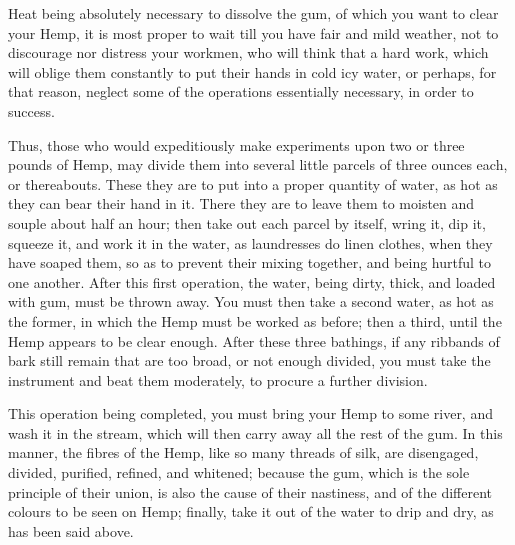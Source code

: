 \documentclass[a4paper, 11pt, oneside, polutonikogreek, english]{article}
\begin{document}
Heat being absolutely necessary to dissolve the gum, of which you want to clear your Hemp, it is most proper to wait till you have fair and mild weather, not to discourage nor distress your workmen, who will think that a hard work, which will oblige them constantly to put their hands in cold icy water, or perhaps, for that reason, neglect some of the operations essentially necessary, in order to success.

Thus, those who would expeditiously make experiments upon two or three pounds of Hemp, may divide them into several little parcels of three ounces each, or thereabouts. These they are to put into a proper quantity of water, as hot as they can bear their hand in it. There they are to leave them to moisten and souple about half an hour; then take out each parcel by itself, wring it, dip it, squeeze it, and work it in the water, as laundresses do linen clothes, when they have soaped them, so as to prevent their mixing together, and being hurtful to one another. After this first operation, the water, being dirty, thick, and loaded with gum, must be thrown away. You must then take a second water, as hot as the former, in which the Hemp must be worked as before; then a third, until the Hemp appears to be clear enough. After these three bathings, if any ribbands of bark still remain that are too broad, or not enough divided, you must take the instrument and beat them moderately, to procure a further division.

This operation being completed, you must bring your Hemp to some river, and wash it in the stream, which will then carry away all the rest of the gum. In this manner, the fibres of the Hemp, like so many threads of silk, are disengaged, divided, purified, refined, and whitened; because the gum, which is the sole principle of their union, is also the cause of their nastiness, and of the different colours to be seen on Hemp; finally, take it out of the water to drip and dry, as has been said above.
\end{document}

